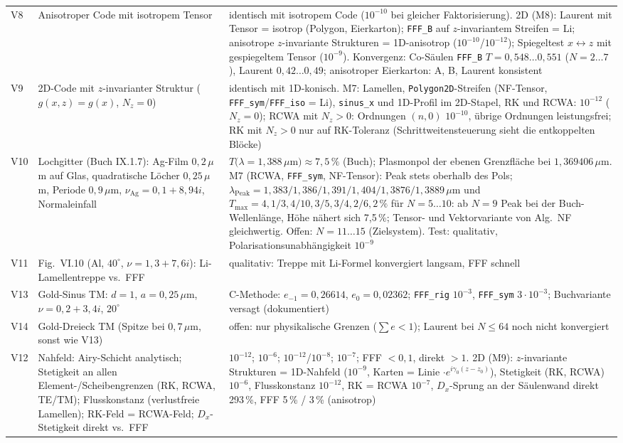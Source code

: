 \begin{center}
\begin{tabular}{p{0.6cm}p{6.6cm}p{6.6cm}}
V8 & Anisotroper Code mit isotropem Tensor & identisch mit isotropem Code ($10^{-10}$ bei gleicher Faktorisierung).
     2D (M8): Laurent mit Tensor = isotrop (Polygon, Eierkarton); \verb|FFF_B| auf $z$-invariantem Streifen = Li;
     anisotrope $z$-invariante Strukturen = 1D-anisotrop ($10^{-10}$/$10^{-12}$); Spiegeltest $x\leftrightarrow z$
     mit gespiegeltem Tensor ($10^{-9}$). Konvergenz: Co-Säulen \verb|FFF_B| $T=0{,}548\ldots0{,}551$ ($N=2\ldots7$),
     Laurent $0{,}42\ldots0{,}49$; anisotroper Eierkarton: A, B, Laurent konsistent \\
V9 & 2D-Code mit $z$-invarianter Struktur ($g(x,z)=g(x)$, $N_z=0$) & identisch mit 1D-konisch.
     M7: Lamellen, \texttt{Polygon2D}-Streifen (NF-Tensor, \verb|FFF_sym|/\verb|FFF_iso| = Li),
     \verb|sinus_x| und 1D-Profil im 2D-Stapel, RK und RCWA: $10^{-12}$ ($N_z=0$); RCWA mit $N_z>0$: Ordnungen
     $(n,0)$ $10^{-10}$, übrige Ordnungen leistungsfrei; RK mit $N_z>0$ nur auf RK-Toleranz (Schrittweitensteuerung
     sieht die entkoppelten Blöcke) \\
V10 & Lochgitter (Buch IX.1.7): Ag-Film $0{,}2\,\mu$m auf Glas, quadratische Löcher $0{,}25\,\mu$m,
      Periode $0{,}9\,\mu$m, $\nu_{\text{Ag}}=0{,}1+8{,}94i$, Normaleinfall & $T(\lambda=1{,}388\,\mu$m$)\approx7{,}5\,\%$
      (Buch); Plasmonpol der ebenen Grenzfläche bei $1{,}369406\,\mu$m. M7 (RCWA, \verb|FFF_sym|, NF-Tensor):
      Peak stets oberhalb des Pols; $\lambda_{\text{Peak}}=1{,}383/1{,}386/1{,}391/1{,}404/1{,}3876/1{,}3889\,\mu$m und
      $T_{\max}=4{,}1/3{,}4/10{,}3/5{,}3/4{,}2/6{,}2\,\%$ für $N=5\ldots10$: ab $N=9$ Peak bei der Buch-Wellenlänge,
      Höhe nähert sich 7,5\,\%; Tensor- und Vektorvariante von Alg.~NF gleichwertig. Offen: $N=11\ldots15$
      (Zielsystem). Test: qualitativ, Polarisationsunabhängigkeit $10^{-9}$ \\
V11 & Fig.\ VI.10 (Al, $40^\circ$, $\nu=1{,}3+7{,}6i$): Li-Lamellentreppe vs.\ FFF & qualitativ: Treppe mit
      Li-Formel konvergiert langsam, FFF schnell \\
V13 & Gold-Sinus TM: $d=1$, $a=0{,}25\,\mu$m, $\nu=0{,}2+3{,}4i$, $20^\circ$ &
      C-Methode: $e_{-1}=0{,}26614$, $e_0=0{,}02362$; \verb|FFF_rig| $10^{-3}$, \verb|FFF_sym| $3\cdot10^{-3}$;
      Buchvariante versagt (dokumentiert) \\
V14 & Gold-Dreieck TM (Spitze bei $0{,}7\,\mu$m, sonst wie V13) & offen: nur physikalische Grenzen
      ($\sum e<1$); Laurent bei $N\le64$ noch nicht konvergiert \\
V12 & Nahfeld: Airy-Schicht analytisch; Stetigkeit an allen Element-/Scheibengrenzen (RK, RCWA, TE/TM);
      Flusskonstanz (verlustfreie Lamellen); RK-Feld = RCWA-Feld; $D_x$-Stetigkeit direkt vs.\ FFF &
      $10^{-12}$; $10^{-6}$; $10^{-12}$/$10^{-8}$; $10^{-7}$; FFF $<0{,}1$, direkt $>1$.
      2D (M9): $z$-invariante Strukturen = 1D-Nahfeld ($10^{-9}$, Karten = Linie $\cdot e^{i\gamma_0(z-z_0)}$),
      Stetigkeit (RK, RCWA) $10^{-6}$, Flusskonstanz $10^{-12}$, RK = RCWA $10^{-7}$, $D_x$-Sprung an der
      Säulenwand direkt 293\,\%, FFF 5\,\% / 3\,\% (anisotrop) \\
\bottomrule
\end{tabular}
\end{center}

